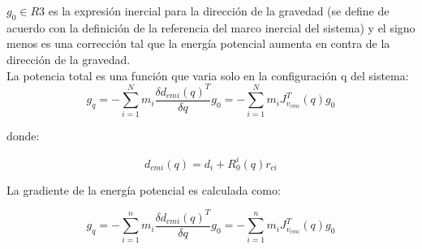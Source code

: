     $g_0 ∈ R3$ es la expresión inercial para la dirección de la gravedad (se define de acuerdo con la definición de la
    referencia del marco inercial del sistema) y el signo menos es una corrección tal que la energía potencial aumenta
    en contra de la dirección de la gravedad.\\
    La potencia total es una función que varia solo en la configuración q del sistema: 
    $$g_{q}=-\sum_{i=1}^{N}m_{i}\frac{\delta d_{cmi}(q)^{T}}{\delta q}g_{0}=-\sum_{i=1}^{N}m_{i}J_{v_{cmi}}^{T}(q)g_{0}$$

    donde:

    $$d_{cmi}(q)=d_{i}+R^{i}_{0}(q)r_{ci}$$

    La gradiente de la energía potencial es calculada como:

    $$g_{q}=- \sum_{i=1}^{n}m_{i}\frac{\delta d_{cmi}(q)^{T}}{\delta q}g_{0}=-\sum_{i=1}^{n}m_{i}J_{v_{cmi}}^{T}(q)g_{0}$$